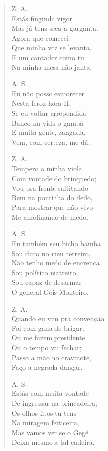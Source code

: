 \begin{verse}
Z. A.\\
Estás fingindo vigor\\
Mas já tens seca a garganta.\\
Agora que comecei\\
Que minha voz se levanta,\\
E um cantador como tu\\
Na minha mesa não janta.

A. S.\\
Eu não posso esmorecer\\
Nesta feroz hora H;\\
Se eu voltar arrependido\\
Banco na vida o gambá\\
E muita gente, zangada,\\
Vem, com certeza, me dá.

Z. A.\\
Tempero a minha viola\\
Com vontade do brinquedo;\\
Vou pra frente saltitando\\
Bem na pontinha do dedo,\\
Para mostrar que não vivo\\
Me amofinando de medo.

A. S.\\
Eu também sou bicho bamba\\
Sou duro no meu terreiro,\\
Não tenho medo de encrenca\\
Sou político matreiro,\\
Sou capaz de desarmar\\
O general Góis Monteiro.
\pagebreak

Z. A.\\
Quando eu vim pra convenção\\
Foi com gana de brigar;\\
Ou me fazem presidente\\
Ou o tempo vai fechar;\\
Passo a mão no cravinote,\\
Faço a negrada dançar.

A. S.\\
Estás com muita vontade\\
De ingressar na brincadeira;\\
Os olhos fitos tu tens\\
Na miragem feiticeira,\\
Mas vamos ver se o Gegê\\
Deixa mesmo a tal cadeira.


\end{verse}
